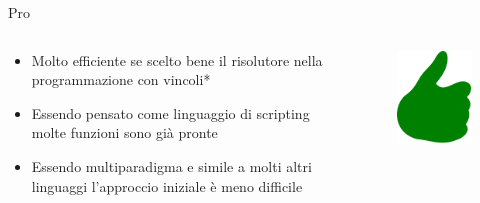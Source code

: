 \begin{frame}{Pro}

	\begin{columns}

		\begin{column}{1\textwidth}

			\begin{itemize}
				\item Molto efficiente se scelto bene il risolutore nella programmazione con vincoli*
				\item Essendo pensato come linguaggio di scripting molte funzioni sono già pronte
				\item Essendo multiparadigma e simile a molti altri linguaggi l'approccio iniziale è meno difficile
			\end{itemize}

		\end{column}

		\begin{column}{0.1\textwidth}
			\begin{figure}
				\vspace*{-5cm}
				\hspace*{-2cm}
				\includegraphics[scale=0.3]{res/pro}
			\end{figure}
		\end{column}

	\end{columns}

\end{frame}